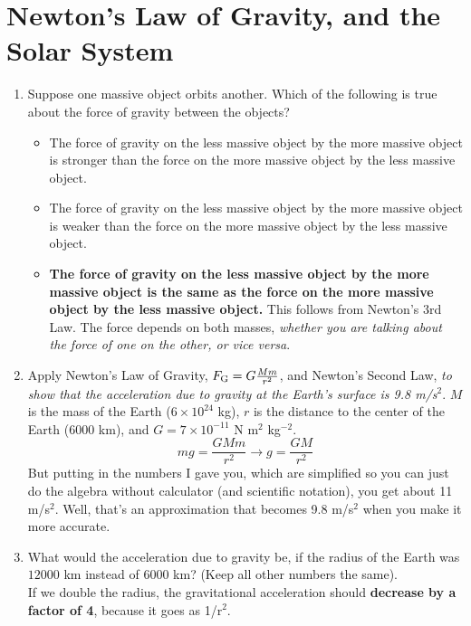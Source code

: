 \documentclass[10pt]{article}
\begin{document}
\section{Newton's Law of Gravity, and the Solar System}
\begin{enumerate}
\item Suppose one massive object orbits another.  Which of the following is true about the force of gravity between the objects?
\begin{itemize}
\item The force of gravity on the less massive object by the more massive object is stronger than the force on the more massive object by the less massive object.
\item The force of gravity on the less massive object by the more massive object is weaker than the force on the more massive object by the less massive object.
\item \textbf{The force of gravity on the less massive object by the more massive object is the same as the force on the more massive object by the less massive object.}  This follows from Newton's 3rd Law.  The force depends on both masses, \textit{whether you are talking about the force of one on the other, or vice versa}.
\end{itemize}
\item Apply Newton's Law of Gravity, $F_{\rm G} = G\frac{M m}{r^2}$, and Newton's Second Law, \textit{to show that the acceleration due to gravity at the Earth's surface is 9.8 m/s$^2$}.  $M$ is the mass of the Earth ($6\times 10^{24}$ kg), $r$ is the distance to the center of the Earth ($6000$ km), and $G = 7 \times 10^{-11}$ N m$^2$ kg$^{-2}$. \\
\begin{equation}
mg = \frac{GMm}{r^2} \rightarrow g = \frac{GM}{r^2}
\end{equation}
But putting in the numbers I gave you, which are simplified so you can just do the algebra without calculator (and scientific notation), you get about 11 m/s$^2$.  Well, that's an approximation that becomes 9.8 m/s$^2$ when you make it more accurate.
\item What would the acceleration due to gravity be, if the radius of the Earth was $12000$ km instead of $6000$ km? (Keep all other numbers the same). \\ If we double the radius, the gravitational acceleration should \textbf{decrease by a factor of 4}, because it goes as 1/r$^2$.
\end{enumerate}
\end{document}
